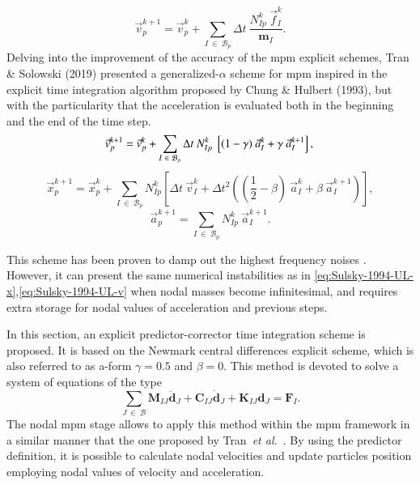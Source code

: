 \documentclass[preprint,12pt,a4paper]{elsarticle}
\newcommand{\tens}[1]{
  \ensuremath{\mathbf{{#1}}}
}
\newcommand{\Matrix}[1]{
  \ensuremath{\mathbf{{#1}}}
}
\newcommand{\Vector}[1]{
  \ensuremath{\mathbf{{#1}}}
}
\begin{document}
\begin{equation}
  \label{eq:Zhang-2016-UL-v}
  \vec{v}_p^{k+1} = \vec{v}_p^{k} + \sum_{I\ \in\ \mathcal{B}_p} \Delta t\ \frac{N_{Ip}^{k}\ \vec{f}_{I}^{k}}{\tens{m}_I}.
\end{equation}
Delving into the improvement of the accuracy of the \acrshort{mpm} explicit schemes, Tran \& Solowski (2019)\cite{Tran2019e} presented a
generalized-$\alpha$ scheme for \acrshort{mpm} inspired in the explicit time
integration algorithm proposed by Chung \& Hulbert
(1993)\cite{Geranlized_alpha_1993}, but with the particularity that
the acceleration is evaluated both in the beginning and the end of the
time step.
\begin{equation}
  \label{eq:Tran-2019-GA-v}
  \vec{v}_p^{k+1} = \vec{v}_p^{k} + \sum_{I\ \in\ \mathcal{B}_p} \Delta t\  N_{Ip}^{k}\ \left[(1 - \gamma)\ \vec{a}_I^{k} +
    \gamma\ \vec{a}_I^{k+1} \right],\\
\end{equation}
\begin{equation}
\label{eq:Tran-2019-GA-x}
  \vec{x}_p^{k+1} = \vec{x}_p^{k} + \sum_{I\ \in\ \mathcal{B}_p} N_{Ip}^{k} \left[ \Delta t\ \vec{v}_{I}^{k}+ \Delta t^2\left( (\frac{1}{2} - \beta)\
    \vec{a}_{I}^{k} + \beta\ \vec{a}_{I}^{k+1} \right) \right],
\end{equation}
\begin{equation}
  \label{eq:Tran-2019-GA-a}
  \vec{a}_p^{k+1} = \sum_{I\ \in\ \mathcal{B}_p} N_{Ip}^{k}\ \vec{a}_{I}^{k+1}.
\end{equation}

This scheme has been proven to damp out the highest frequency noises
\cite{Tran2019e}. However, it can present the same numerical instabilities
as in \eqref{eq:Sulsky-1994-UL-x},\eqref{eq:Sulsky-1994-UL-v} when
nodal masses become infinitesimal, and requires extra storage for
nodal values of acceleration and previous steps.

In this section, an explicit predictor-corrector time integration
scheme is proposed. It is based on the Newmark central differences
explicit scheme, which is also referred to as a-form 
$\gamma = 0.5$ and $\beta = 0$. This method is devoted to solve a system of equations of the type
\begin{equation*}
 \sum_{J\ \in\ \mathcal{B}} \Matrix{M}_{IJ}\ddot{\Vector{d}}_{J} + \Matrix{C}_{IJ}\dot{\Vector{d}}_{J} +
  \Matrix{K}_{IJ}\Vector{d}_{J} = \Vector{F}_{I}.
\end{equation*}
The nodal \acrshort{mpm} stage allows to apply this method
within the \acrshort{mpm} framework in a similar manner that the one
proposed by Tran~\textit{et al.}~\cite{Tran2019e}. By using the predictor definition, it is possible to calculate nodal velocities and update particles position employing nodal values
of velocity and acceleration. 
\end{document}

